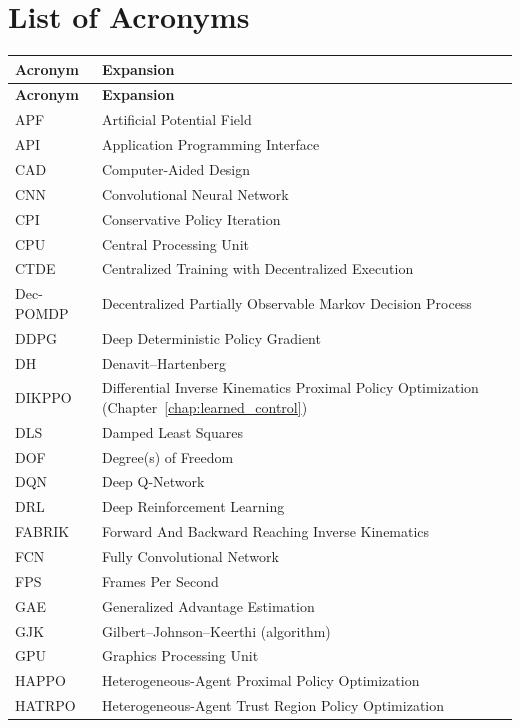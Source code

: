 \cleardoublepage
\chapter*{List of Acronyms}
\makeatletter
{}
\makeatother

\begin{xltabular}{\textwidth}{@{}l X@{}}
\toprule
\textbf{Acronym} & \textbf{Expansion} \\
\midrule
\endfirsthead
\toprule
\textbf{Acronym} & \textbf{Expansion} \\
\midrule
\endhead
\bottomrule
\endfoot
APF & Artificial Potential Field \\
API & Application Programming Interface \\
CAD & Computer-Aided Design \\
CNN & Convolutional Neural Network \\
CPI & Conservative Policy Iteration \\
CPU & Central Processing Unit \\
CTDE & Centralized Training with Decentralized Execution \\
Dec-POMDP & Decentralized Partially Observable Markov Decision Process \\
DDPG & Deep Deterministic Policy Gradient \\
DH & Denavit--Hartenberg \\
DIKPPO & Differential Inverse Kinematics Proximal Policy Optimization (Chapter~\ref{chap:learned_control}) \\
DLS & Damped Least Squares \\
DOF & Degree(s) of Freedom \\
DQN & Deep Q-Network \\
DRL & Deep Reinforcement Learning \\
FABRIK & Forward And Backward Reaching Inverse Kinematics \\
FCN & Fully Convolutional Network \\
FPS & Frames Per Second \\
GAE & Generalized Advantage Estimation \\
GJK & Gilbert--Johnson--Keerthi (algorithm) \\
GPU & Graphics Processing Unit \\
HAPPO & Heterogeneous-Agent Proximal Policy Optimization \\
HATRPO & Heterogeneous-Agent Trust Region Policy Optimization \\

\end{xltabular}
